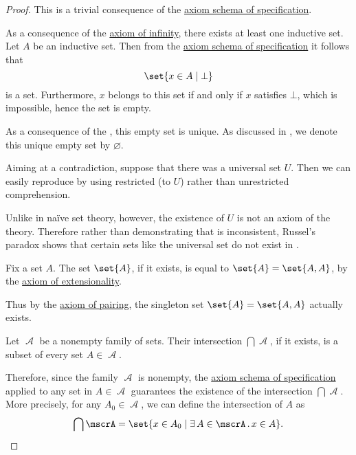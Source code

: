 \begin{proof}
   This is a trivial consequence of the \hyperref[def:zfc/specification]{axiom schema of specification}.

   As a consequence of the \hyperref[def:zfc/infinity]{axiom of infinity}, there exists at least one inductive set. Let \( A \) be an inductive set. Then from the \hyperref[def:zfc/specification]{axiom schema of specification} it follows that
  \begin{equation*}
    \set{ x \in A \given \bot }
  \end{equation*}
  is a set. Furthermore, \( x \) belongs to this set if and only if \( x \) satisfies \( \bot \), which is impossible, hence the set is empty.

  As a consequence of the , this empty set is unique. As discussed in , we denote this unique empty set by \( \varnothing \).

   Aiming at a contradiction, suppose that there was a universal set \( U \). Then we can easily reproduce  by using restricted (to \( U \)) rather than unrestricted comprehension.

  Unlike in na\"ive set theory, however, the existence of \( U \) is not an axiom of the theory. Therefore rather than demonstrating that  is inconsistent, Russel's paradox shows that certain sets like the universal set do not exist in .

   Fix a set \( A \). The set \( \set{A} \), if it exists, is equal to \( \set{A} = \set{A, A} \), by the \hyperref[def:zfc/extensionality]{axiom of extensionality}.

  Thus by the \hyperref[def:zfc/pairing]{axiom of pairing}, the singleton set \( \set{A} = \set{A, A} \) actually exists.

   Let \( \mscrA \) be a nonempty family of sets. Their intersection \( \bigcap \mscrA \), if it exists, is a subset of every set \( A \in \mscrA \).

  Therefore, since the family \( \mscrA \) is nonempty, the \hyperref[def:zfc/specification]{axiom schema of specification} applied to any set in \( A \in \mscrA \) guarantees the existence of the intersection \( \bigcap \mscrA \). More precisely, for any \( A_0 \in \mscrA \), we can define the intersection of \( A \) as
  \begin{equation*}
    \bigcap \mscrA = \set{ x \in A_0 \given \qexists {A \in \mscrA} x \in A }.
  \end{equation*}


\end{proof}
